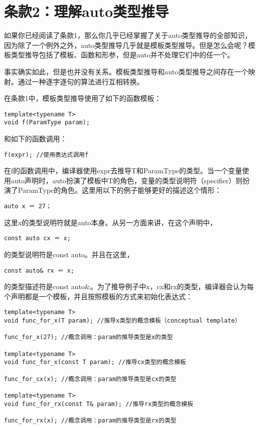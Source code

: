 \section{条款2：理解auto类型推导}

如果你已经阅读了条款1，那么你几乎已经掌握了关于auto类型推导的全部知识，因为除了一个例外之外，auto类型推导几乎就是模板类型推导。但是怎么会呢？模板类型推导包括了模板、函数和形参，但是auto并不处理它们中的任一个。

事实确实如此，但是也并没有关系。模板类型推导和auto类型推导之间存在一个映射。通过一种逐字逐句的算法进行互相转换。

在条款1中，模板类型推导使用了如下的函数模板：

\begin{lstlisting}
template<typename T>
void f(ParamType param);
\end{lstlisting}

和如下的函数调用：

\begin{lstlisting}
f(expr); //使用表达式调用f
\end{lstlisting}

在f的函数调用中，编译器使用expr去推导T和ParamType的类型。当一个变量使用auto声明时，auto扮演了模板中T的角色，变量的类型说明符（specifier）则扮演了ParamType的角色。这里用以下的例子能够更好的描述这个情形：

\begin{lstlisting}
auto x ＝ 27；
\end{lstlisting}

这里x的类型说明符就是auto本身。从另一方面来讲，在这个声明中，

\begin{lstlisting}
const auto cx ＝ x;
\end{lstlisting}

的类型说明符是const auto。并且在这里，

\begin{lstlisting}
const auto& rx ＝ x;
\end{lstlisting}

的类型描述符是const auto\&。为了推导例子中x，cx和rx的类型，编译器会认为每个声明都是一个模板，并且按照模板的方式来初始化表达式：

\begin{lstlisting}
template<typename T>
void func_for_x(T param); //推导x类型的概念模板（conceptual template）

func_for_x(27); //概念调用：param的推导类型是x的类型

template<typename T>
void func_for_x(const T param); //推导cx类型的概念模板

func_for_cx(x); //概念调用：param的推导类型是cx的类型

template<typename T>
void func_for_rx(const T& param); //推导rx类型的概念模板

func_for_rx(x); //概念调用：param的推导类型是rx的类型
\end{lstlisting}

